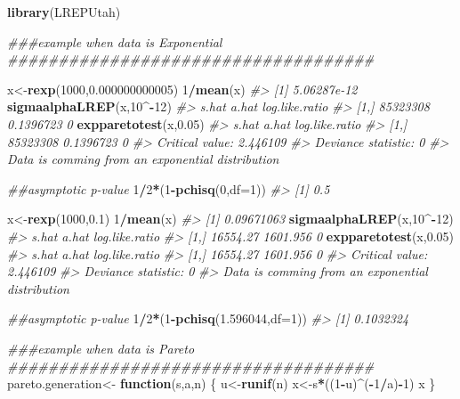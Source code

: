 \documentclass[
]{article}
\newenvironment{Shaded}{\begin{snugshade}}{\end{snugshade}}
\newcommand{\CommentTok}[1]{\textcolor[rgb]{0.56,0.35,0.01}{\textit{#1}}}
\newcommand{\ControlFlowTok}[1]{\textcolor[rgb]{0.13,0.29,0.53}{\textbf{#1}}}
\newcommand{\DataTypeTok}[1]{\textcolor[rgb]{0.13,0.29,0.53}{#1}}
\newcommand{\DecValTok}[1]{\textcolor[rgb]{0.00,0.00,0.81}{#1}}
\newcommand{\FloatTok}[1]{\textcolor[rgb]{0.00,0.00,0.81}{#1}}
\newcommand{\KeywordTok}[1]{\textcolor[rgb]{0.13,0.29,0.53}{\textbf{#1}}}
\newcommand{\NormalTok}[1]{#1}
\newcommand{\OperatorTok}[1]{\textcolor[rgb]{0.81,0.36,0.00}{\textbf{#1}}}
\newcommand{\StringTok}[1]{\textcolor[rgb]{0.31,0.60,0.02}{#1}}
\begin{document}
\begin{Shaded}
\begin{Highlighting}[]
\KeywordTok{library}\NormalTok{(LREPUtah)}

\CommentTok{###example when data is Exponential}
\CommentTok{####################################}

\NormalTok{x<-}\KeywordTok{rexp}\NormalTok{(}\DecValTok{1000}\NormalTok{,}\FloatTok{0.000000000005}\NormalTok{)}
\DecValTok{1}\OperatorTok{/}\KeywordTok{mean}\NormalTok{(x)}
\CommentTok{#> [1] 5.06287e-12}
\KeywordTok{sigmaalphaLREP}\NormalTok{(x,}\DecValTok{10}\OperatorTok{^-}\DecValTok{12}\NormalTok{)}
\CommentTok{#>         s.hat     a.hat log.like.ratio}
\CommentTok{#> [1,] 85323308 0.1396723              0}
\KeywordTok{expparetotest}\NormalTok{(x,}\FloatTok{0.05}\NormalTok{)}
\CommentTok{#>         s.hat     a.hat log.like.ratio}
\CommentTok{#> [1,] 85323308 0.1396723              0}
\CommentTok{#> Critical value: 2.446109 }
\CommentTok{#> Deviance statistic: 0 }
\CommentTok{#> Data is comming from an exponential distribution}

\CommentTok{##asymptotic p-value}
\DecValTok{1}\OperatorTok{/}\DecValTok{2}\OperatorTok{*}\NormalTok{(}\DecValTok{1}\OperatorTok{-}\KeywordTok{pchisq}\NormalTok{(}\DecValTok{0}\NormalTok{,}\DataTypeTok{df=}\DecValTok{1}\NormalTok{))}
\CommentTok{#> [1] 0.5}


\NormalTok{x<-}\KeywordTok{rexp}\NormalTok{(}\DecValTok{1000}\NormalTok{,}\FloatTok{0.1}\NormalTok{)}
\DecValTok{1}\OperatorTok{/}\KeywordTok{mean}\NormalTok{(x)}
\CommentTok{#> [1] 0.09671063}
\KeywordTok{sigmaalphaLREP}\NormalTok{(x,}\DecValTok{10}\OperatorTok{^-}\DecValTok{12}\NormalTok{)}
\CommentTok{#>         s.hat    a.hat log.like.ratio}
\CommentTok{#> [1,] 16554.27 1601.956              0}
\KeywordTok{expparetotest}\NormalTok{(x,}\FloatTok{0.05}\NormalTok{)}
\CommentTok{#>         s.hat    a.hat log.like.ratio}
\CommentTok{#> [1,] 16554.27 1601.956              0}
\CommentTok{#> Critical value: 2.446109 }
\CommentTok{#> Deviance statistic: 0 }
\CommentTok{#> Data is comming from an exponential distribution}

\CommentTok{##asymptotic p-value}
\DecValTok{1}\OperatorTok{/}\DecValTok{2}\OperatorTok{*}\NormalTok{(}\DecValTok{1}\OperatorTok{-}\KeywordTok{pchisq}\NormalTok{(}\FloatTok{1.596044}\NormalTok{,}\DataTypeTok{df=}\DecValTok{1}\NormalTok{))}
\CommentTok{#> [1] 0.1032324}


\CommentTok{###example when data is Pareto}
\CommentTok{####################################}
\NormalTok{pareto.generation<-}\StringTok{ }\ControlFlowTok{function}\NormalTok{(s,a,n)}
\NormalTok{\{}
\NormalTok{    u<-}\KeywordTok{runif}\NormalTok{(n)}
\NormalTok{    x<-s}\OperatorTok{*}\NormalTok{((}\DecValTok{1}\OperatorTok{-}\NormalTok{u)}\OperatorTok{^}\NormalTok{(}\OperatorTok{-}\DecValTok{1}\OperatorTok{/}\NormalTok{a)}\OperatorTok{-}\DecValTok{1}\NormalTok{)}
\NormalTok{    x}
\NormalTok{\}}



\end{Highlighting}
\end{Shaded}
\end{document}
